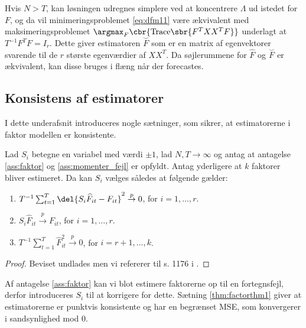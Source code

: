 Hvis \(N > T\), kan løsningen udregnes simplere ved at koncentrere \(\Lambda\) ud istedet for \(F\), og da vil minimeringsproblemet \eqref{eq:dfm11} være ækvivalent med maksimeringsproblemet \(\argmax_F \cbr{ \text{Trace} \sbr{ F^T X X^T F}}\) underlagt at \(T^{-1} F^T F = I_r\).
Dette giver estimatoren \(\overset{\smile}{F}\) som er en matrix af egenvektorer svarende til de \(r\) største egenværdier af \(X X^T\).
Da søjlerummene for \(\widehat{F}\) og \(\overset{\smile}{F}\) er ækvivalent, kan disse bruges i flæng når der forecastes.
%



\subsection{Konsistens af estimatorer}
I dette underafsnit introduceres nogle sætninger, som sikrer, at estimatorerne i faktor modellen er konsistente.
%
\begin{thm} \label{thm:factorthm1}
Lad \(S_i\) betegne en variabel med værdi \(\pm 1\), lad \(N, T \rightarrow \infty\) og antag at antagelse \ref{ass:faktor} og \ref{ass:momenter_fejl} er opfyldt.
Antag yderligere at \(k\) faktorer bliver estimeret.
Da kan \(S_i\) vælges således at følgende gælder:
\begin{enumerate}
\item \(T^{-1} \sum_{t=1}^T \del{S_i \widehat{F}_{it} - F_{it}}^2 \overset{p}{\rightarrow} 0\), for \(i=1, \ldots, r\).
\item \(S_i \widehat{F}_{it} \overset{p}{\rightarrow} F_{it}\), for \(i=1, \ldots, r\).
\item \(T^{-1} \sum_{t=1}^T \widehat{F}_{it}^2 \overset{p}{\rightarrow} 0\), for \(i=r+1, \ldots, k\).
\end{enumerate}
\end{thm}
%
\begin{proof}
Beviset undlades men vi refererer til s. 1176 i \citep{stock_watson_2002a}.
\end{proof}
%
Af antagelse \ref{ass:faktor} kan vi blot estimere faktorerne op til en fortegnsfejl, derfor introduceres  \(S_i\) til at korrigere for dette.
Sætning \ref{thm:factorthm1} giver at estimatorerne er punktvis konsistente og har en begrænset MSE, som konvergerer i sandsynlighed mod 0.

